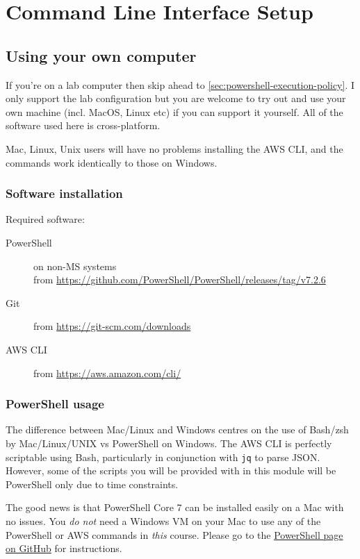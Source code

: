 \chapter{Command Line Interface Setup}
\label{ch:cli-setup}

\section{Using your own computer}

If you're on a lab computer then skip ahead to \autoref{sec:powershell-execution-policy}.
I only support the lab configuration but you are welcome to try out and use your own machine (incl. MacOS, Linux etc) if you can support it yourself.
All of the software used here is cross-platform.

Mac, Linux, Unix users will have no problems installing the AWS CLI, and the commands work identically to those on Windows.


\subsection{Software installation}

Required software:
\begin{description}
\item[PowerShell] on non-MS systems\\from \url{https://github.com/PowerShell/PowerShell/releases/tag/v7.2.6}
\item[Git] from \url{https://git-scm.com/downloads}
\item[AWS CLI] from \url{https://aws.amazon.com/cli/}
\end{description}

\subsection{PowerShell usage}

The difference between Mac/Linux and Windows centres on the use of
Bash/zsh by Mac/Linux/UNIX vs PowerShell on Windows. The AWS CLI is
perfectly scriptable using Bash, particularly in conjunction with
\texttt{jq} to parse JSON. However, some of the scripts you will be
provided with in this module will be PowerShell only due to time
constraints.

The good news is that PowerShell Core 7 can be installed easily on a Mac
with no issues. You \emph{do not} need a Windows VM on your Mac to use
any of the PowerShell or AWS commands in \emph{this} course. Please go
to the \href{https://github.com/PowerShell/PowerShell}{PowerShell page
on GitHub} for instructions.

